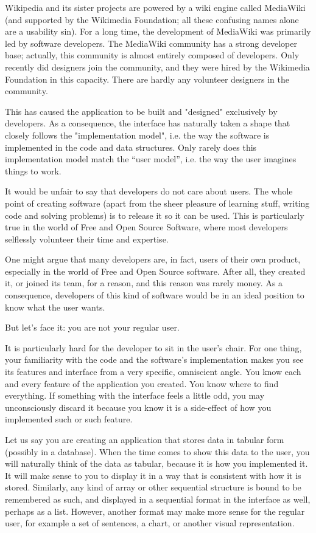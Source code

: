 Wikipedia and its sister projects are powered by a wiki engine called MediaWiki (and supported by the Wikimedia Foundation; all these confusing names alone are a usability sin). For a long time, the development of MediaWiki was primarily led by software developers. The MediaWiki community has a strong developer base; actually, this community is almost entirely composed of developers. Only recently did designers join the community, and they were hired by the Wikimedia Foundation in this capacity. There are hardly any volunteer designers in the community.

This has caused the application to be built and "designed" exclusively by developers. As a consequence, the interface has naturally taken a shape that closely follows the "implementation model", i.e. the way the software is implemented in the code and data structures. Only rarely does this implementation model match the ``user model'', i.e. the way the user imagines things to work.

It would be unfair to say that developers do not care about users. The whole point of creating software (apart from the sheer pleasure of learning stuff, writing code and solving problems) is to release it so it can be used. This is particularly true in the world of Free and Open Source Software, where most developers selflessly volunteer their time and expertise.

One might argue that many developers are, in fact, users of their own product, especially in the world of Free and Open Source software. After all, they created it, or joined its team, for a reason, and this reason was rarely money. As a consequence, developers of this kind of software would be in an ideal position to know what the user wants.

But let's face it: you are not your regular user.

It is particularly hard for the developer to sit in the user's chair. For one thing, your familiarity with the code and the software's implementation makes you see its features and interface from a very specific, omniscient angle. You know each and every feature of the application you created. You know where to find everything. If something with the interface feels a little odd, you may unconsciously discard it because you know it is a side-effect of how you implemented such or such feature.

Let us say you are creating an application that stores data in tabular form (possibly in a database). When the time comes to show this data to the user, you will naturally think of the data as tabular, because it is how you implemented it. It will make sense to you to display it in a way that is consistent with how it is stored. Similarly, any kind of array or other sequential structure is bound to be remembered as such, and displayed in a sequential format in the interface as well, perhaps as a list. However, another format may make more sense for the regular user, for example a set of sentences, a chart, or another visual representation.

